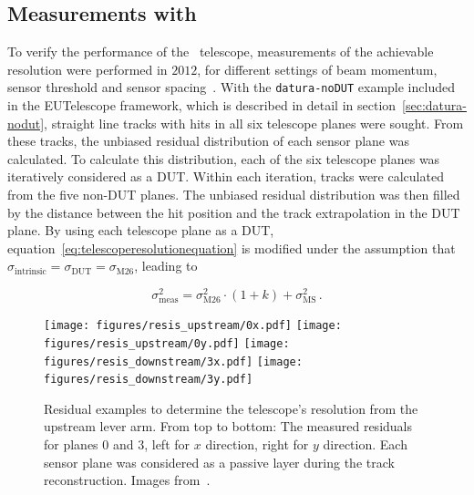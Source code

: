 \subsection{Measurements with \Datura}

To verify the performance of the \Datura~telescope, measurements of the achievable resolution were performed in $2012$, for different settings of beam momentum,
 sensor threshold and sensor spacing~\cite{ref:thomas}.
With the \texttt{datura-noDUT} example included in the {EUTelescope} framework, which is described in detail in section~\ref{sec:datura-nodut},
 straight line tracks with hits in all six telescope planes were sought. 
From these tracks, the unbiased residual distribution of each sensor plane was calculated.
To calculate this distribution, each of the six telescope planes was iteratively considered as a DUT.
Within each iteration, tracks were calculated from the five non-DUT planes.
The unbiased residual distribution was then filled by the distance between the hit position and the track extrapolation in the DUT plane.
By using each telescope plane as a DUT, equation~\ref{eq:telescoperesolutionequation} is modified under the assumption that $\sigma_{\textrm{intrinsic}} = \sigma_{\textrm{DUT}} = \sigma_{\textrm{M26}}$,
 leading to

\begin{equation}
\label{eq:telescoperesolutionequation_2}
\sigma_{\textrm{meas}}^2 = \sigma_{\textrm{M26}}^2 \cdot \left( 1 + k \right) +
\sigma_{\textrm{MS}}^2\,.
\end{equation}

\begin{figure}[tb]
  \centering
  \texttt{[image: figures/resis\_upstream/0x.pdf]}
  \texttt{[image: figures/resis\_upstream/0y.pdf]}
  \texttt{[image: figures/resis\_downstream/3x.pdf]}
  \texttt{[image: figures/resis\_downstream/3y.pdf]}
  \caption[Residual examples to determine the \Datura telescope's resolution~\cite{ref:thomas}]{Residual examples to determine the \Datura telescope's resolution from the upstream lever arm.
From top to bottom: The measured residuals for planes $0$ and $3$, left for $x$ direction, right for $y$ direction.
Each sensor plane was considered as a passive layer during the track reconstruction. Images from~\cite{ref:thomas}.}
  \label{fig:residualexample1}
\end{figure}

